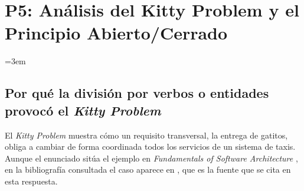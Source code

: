 
\usetikzlibrary{arrows.meta}
\renewcommand{\lstlistingname}{Listado}

\chapter{P5: Análisis del Kitty Problem y el Principio Abierto/Cerrado}
\label{sec:p5}
\begingroup\emergencystretch=3em
\section{Por qué la división por verbos o entidades provocó el \emph{Kitty Problem}}
\label{sec:p5-causas}

El \emph{Kitty Problem} muestra cómo un requisito transversal, la entrega de gatitos, obliga a
cambiar de forma coordinada todos los servicios de un sistema de taxis. Aunque el
enunciado sitúa el ejemplo en \textit{Fundamentals of Software Architecture}
\parencite{richardsford2020}, en la bibliografía consultada el caso aparece en
\textcite[cap.~27]{martin2017}, que es la fuente que se cita en esta respuesta.

